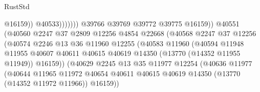\begin{lexlean}{RustStd}
\begin{coremodule}
                                                      @16159))
                                                  @40533)))))))
                                    @39766
                                    @39769
                                    @39772
                                    @39775
                                    @16159))
                                @40551
                                (@40560
                                  @2247
                                  @37
                                  @2809
                                  @12256
                                  @4854
                                  @22668
                                  (@40568
                                    @2247
                                    @37
                                    @12256
                                    (@40574
                                      @2246
                                      @13
                                      @36
                                      @11960
                                      @12255
                                      (@40583
                                        @11960
                                        (@40594
                                          @11948
                                          @11955
                                          @40607
                                          @40611
                                          @40615
                                          @40619
                                          @14350
                                          (@13770 (@14352 @11955 @11949))
                                          @16159))
                                      (@40629
                                        @2245
                                        @13
                                        @35
                                        @11977
                                        @12254
                                        (@40636
                                          @11977
                                          (@40644
                                            @11965
                                            @11972
                                            @40654
                                            @40611
                                            @40615
                                            @40619
                                            @14350
                                            (@13770 (@14352 @11972 @11966))
                                            @16159))

\end{coremodule}
\end{lexlean}
